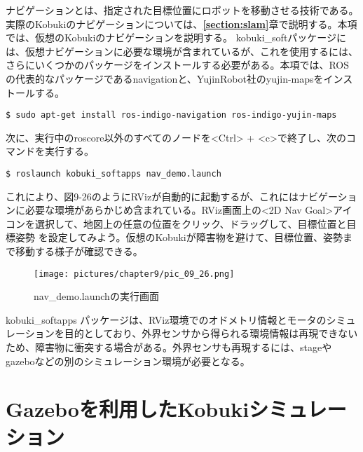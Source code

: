 ナビゲーションとは、指定された目標位置にロボットを移動させる技術である。実際のKobukiのナビゲーションについては、\textbf{\ref{section:slam}}章で説明する。本項では、仮想のKobukiのナビゲーションを説明する。
kobuki\_softパッケージには、仮想ナビゲーションに必要な環境が含まれているが、これを使用するには、さらにいくつかのパッケージをインストールする必要がある。本項では、ROSの代表的なパッケージであるnavigationと、YujinRobot社のyujin-mapsをインストールする。

\begin{lstlisting}[language=ROS]
$ sudo apt-get install ros-indigo-navigation ros-indigo-yujin-maps
\end{lstlisting}

次に、実行中のroscore以外のすべてのノードを<Ctrl> + <c>で終了し、次のコマンドを実行する。

\begin{lstlisting}[language=ROS]
$ roslaunch kobuki_softapps nav_demo.launch
\end{lstlisting}

これにより、図9-26のようにRVizが自動的に起動するが、これにはナビゲーションに必要な環境があらかじめ含まれている。RViz画面上の<2D Nav Goal>アイコンを選択して、地図上の任意の位置をクリック、ドラッグして、目標位置と目標姿勢  を設定してみよう。仮想のKobukiが障害物を避けて、目標位置、姿勢まで移動する様子が確認できる。

\begin{figure}[htp]
  \centering
  \texttt{[image: pictures/chapter9/pic\_09\_26.png]}
  \caption{nav\_demo.launchの実行画面}
\end{figure}

\begin{exercise}
kobuki\_softapps パッケージは、RViz環境でのオドメトリ情報とモータのシミュレーションを目的としており、外界センサから得られる環境情報は再現できないため、障害物に衝突する場合がある。外界センサも再現するには、stageやgazeboなどの別のシミュレーション環境が必要となる。
\end{exercise}

\section{Gazeboを利用したKobukiシミュレーション}

